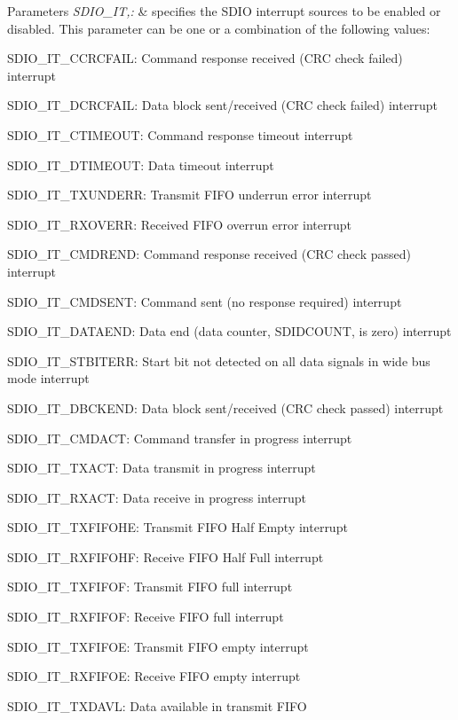 \begin{DoxyParams}{Parameters}
{\em S\-D\-I\-O\-\_\-\-I\-T,\-:} & specifies the S\-D\-I\-O interrupt sources to be enabled or disabled. This parameter can be one or a combination of the following values\-: \begin{DoxyItemize}
\item S\-D\-I\-O\-\_\-\-I\-T\-\_\-\-C\-C\-R\-C\-F\-A\-I\-L\-: Command response received (C\-R\-C check failed) interrupt \item S\-D\-I\-O\-\_\-\-I\-T\-\_\-\-D\-C\-R\-C\-F\-A\-I\-L\-: Data block sent/received (C\-R\-C check failed) interrupt \item S\-D\-I\-O\-\_\-\-I\-T\-\_\-\-C\-T\-I\-M\-E\-O\-U\-T\-: Command response timeout interrupt \item S\-D\-I\-O\-\_\-\-I\-T\-\_\-\-D\-T\-I\-M\-E\-O\-U\-T\-: Data timeout interrupt \item S\-D\-I\-O\-\_\-\-I\-T\-\_\-\-T\-X\-U\-N\-D\-E\-R\-R\-: Transmit F\-I\-F\-O underrun error interrupt \item S\-D\-I\-O\-\_\-\-I\-T\-\_\-\-R\-X\-O\-V\-E\-R\-R\-: Received F\-I\-F\-O overrun error interrupt \item S\-D\-I\-O\-\_\-\-I\-T\-\_\-\-C\-M\-D\-R\-E\-N\-D\-: Command response received (C\-R\-C check passed) interrupt \item S\-D\-I\-O\-\_\-\-I\-T\-\_\-\-C\-M\-D\-S\-E\-N\-T\-: Command sent (no response required) interrupt \item S\-D\-I\-O\-\_\-\-I\-T\-\_\-\-D\-A\-T\-A\-E\-N\-D\-: Data end (data counter, S\-D\-I\-D\-C\-O\-U\-N\-T, is zero) interrupt \item S\-D\-I\-O\-\_\-\-I\-T\-\_\-\-S\-T\-B\-I\-T\-E\-R\-R\-: Start bit not detected on all data signals in wide bus mode interrupt \item S\-D\-I\-O\-\_\-\-I\-T\-\_\-\-D\-B\-C\-K\-E\-N\-D\-: Data block sent/received (C\-R\-C check passed) interrupt \item S\-D\-I\-O\-\_\-\-I\-T\-\_\-\-C\-M\-D\-A\-C\-T\-: Command transfer in progress interrupt \item S\-D\-I\-O\-\_\-\-I\-T\-\_\-\-T\-X\-A\-C\-T\-: Data transmit in progress interrupt \item S\-D\-I\-O\-\_\-\-I\-T\-\_\-\-R\-X\-A\-C\-T\-: Data receive in progress interrupt \item S\-D\-I\-O\-\_\-\-I\-T\-\_\-\-T\-X\-F\-I\-F\-O\-H\-E\-: Transmit F\-I\-F\-O Half Empty interrupt \item S\-D\-I\-O\-\_\-\-I\-T\-\_\-\-R\-X\-F\-I\-F\-O\-H\-F\-: Receive F\-I\-F\-O Half Full interrupt \item S\-D\-I\-O\-\_\-\-I\-T\-\_\-\-T\-X\-F\-I\-F\-O\-F\-: Transmit F\-I\-F\-O full interrupt \item S\-D\-I\-O\-\_\-\-I\-T\-\_\-\-R\-X\-F\-I\-F\-O\-F\-: Receive F\-I\-F\-O full interrupt \item S\-D\-I\-O\-\_\-\-I\-T\-\_\-\-T\-X\-F\-I\-F\-O\-E\-: Transmit F\-I\-F\-O empty interrupt \item S\-D\-I\-O\-\_\-\-I\-T\-\_\-\-R\-X\-F\-I\-F\-O\-E\-: Receive F\-I\-F\-O empty interrupt \item S\-D\-I\-O\-\_\-\-I\-T\-\_\-\-T\-X\-D\-A\-V\-L\-: Data available in transmit F\-I\-F\-O 
\end{DoxyItemize}
\end{DoxyParams}
